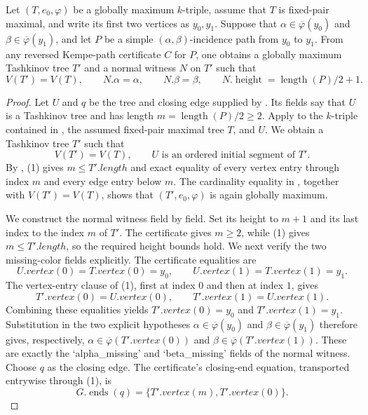 \begin{lemma}
Let $(T,e_0,\varphi)$ be a globally maximum $k$-triple, assume that $T$
is fixed-pair maximal, and write its first two vertices as $y_0,y_1$.
Suppose that $\alpha\in\overline\varphi(y_0)$ and
$\beta\in\overline\varphi(y_1)$, and let $P$ be a simple
$(\alpha,\beta)$-incidence path from $y_0$ to $y_1$.  From any reversed
Kempe-path certificate $C$ for $P$, one obtains a globally maximum Tashkinov
tree $T'$ and a normal witness $N$ on $T'$ such that
\[
 V(T')=V(T),\qquad N.\alpha=\alpha,\qquad N.\beta=\beta,
 \qquad N.\operatorname{height}=\operatorname{length}(P)/2+1.
\]
\end{lemma}
\begin{proof}
Let $U$ and $q$ be the tree and closing edge supplied by
.  Its fields say that $U$ is a
Tashkinov tree and has length
$m=\operatorname{length}(P)/2\geq2$.  Apply
 to the $k$-triple contained in
, the assumed fixed-pair maximal tree $T$,
and $U$.  We obtain a Tashkinov tree $T'$ such that
\[
 V(T')=V(T),\qquad U\text{ is an ordered initial segment of }T'. \tag{1}
\]
By , (1) gives
$m\leq T'.length$ and exact equality of every vertex entry through index
$m$ and every edge entry below $m$.  The cardinality equality in
, together with $V(T')=V(T)$, shows that
$(T',e_0,\varphi)$ is again globally maximum.

We construct the normal witness field by field.  Set its height to
$m+1$ and its last index to the index $m$ of $T'$.  The certificate gives
$m\geq2$, while (1) gives $m\leq T'.length$, so the required height bounds
hold.  We next verify the two missing-color fields explicitly.  The
certificate equalities are
\[
 U.vertex(0)=T.vertex(0)=y_0,
 \qquad U.vertex(1)=T.vertex(1)=y_1.
\]
The vertex-entry clause of (1), first at index $0$ and then at index $1$,
gives
\[
 T'.vertex(0)=U.vertex(0),
 \qquad T'.vertex(1)=U.vertex(1).
\]
Combining these equalities yields $T'.vertex(0)=y_0$ and
$T'.vertex(1)=y_1$.  Substitution in the two explicit hypotheses
$\alpha\in\overline\varphi(y_0)$ and
$\beta\in\overline\varphi(y_1)$ therefore gives, respectively,
$\alpha\in\overline\varphi(T'.vertex(0))$ and
$\beta\in\overline\varphi(T'.vertex(1))$.  These are exactly the
`alpha_missing' and `beta_missing' fields of the normal witness.  Choose
$q$ as the closing edge.  The certificate's closing-end equation,
transported entrywise through (1), is
\[
 G.\operatorname{ends}(q)
   =\{T'.vertex(m),T'.vertex(0)\}.                              \tag{2}
\]


\end{proof}
